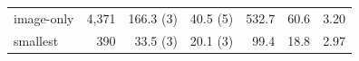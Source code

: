 \begin{tabular}{lrrrrrr}
image-only & 4,371 & 166.3 (3) & 40.5 (5) & 532.7 & 60.6 & 3.20 \\
smallest & 390 & 33.5 (3) & 20.1 (3) & 99.4 & 18.8 & 2.97 \\
\bottomrule
\end{tabular}
